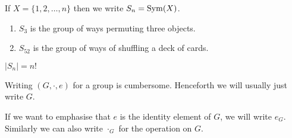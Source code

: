 \documentclass[../main.tex]{subfiles}
\begin{document}
\begin{definition}
  If $X = \{1, 2, \ldots, n\}$ then we write $S_n = \operatorname{Sym}(X)$.
\end{definition}
\begin{example}
  \begin{enumerate}
    \item $S_3$ is the group of ways permuting three objects.
    \item $S_{52}$ is the group of ways of shuffling a deck of cards.
  \end{enumerate}
\end{example}
\begin{remark}
  $|S_n| = n!$
\end{remark}
\begin{remark}[Notation]
  Writing  $(G, \cdot, e)$ for a group is cumbersome.
  Henceforth we will usually just write $G$.

  If we want to emphasise that $e$ is the identity element of $G$, we will write $e_G$.
  Similarly we can also write $\cdot_G$ for the operation on $G$.
\end{remark}
\end{document}
